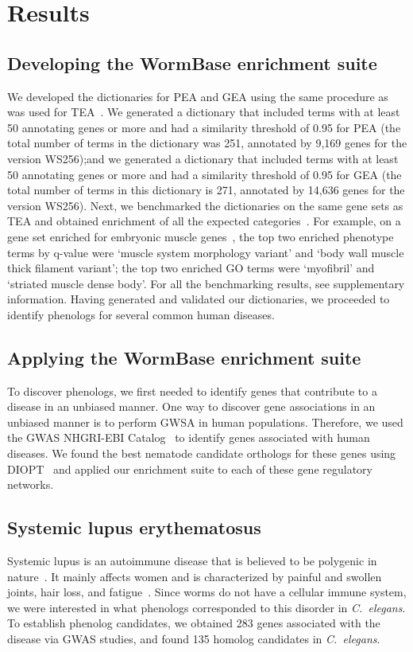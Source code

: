 \documentclass[10pt, onecolumn]{article}
\newcommand{\cel}{\emph{C.~elegans}}
\newcommand{\hlupus}{283}
\newcommand{\wlupus}{135}
\begin{document}
\section*{Results}
\subsection*{Developing the WormBase enrichment suite}
We developed the dictionaries for PEA and GEA using the same procedure as was
used for TEA~\cite{Angeles-Albores2016}. We generated a dictionary that included
terms with at least 50 annotating genes or more and had a similarity threshold
of 0.95 for PEA (the total number of terms in the dictionary was 251, annotated
by 9,169 genes for the version WS256);\@ and we generated a dictionary that
included terms with at least 50 annotating genes or more and had a similarity
threshold of 0.95 for GEA (the total number of terms in this dictionary is 271,
annotated by 14,636 genes for the version WS256). \@ Next, we benchmarked the
dictionaries on the same gene sets as TEA and obtained enrichment of all the
expected categories~\cite{Gaudet2004a, Spencer2011, Cinar2005, Watson2008a,
Pauli2006, Portman2004, Fox2007, Smith2010}. For example, on a gene set enriched
for embryonic muscle genes~\cite{Watson2008a}, the top two enriched phenotype
terms by q-value were `muscle system morphology variant' and `body wall muscle
thick filament variant'; the top two enriched GO terms were `myofibril' and
`striated muscle dense body'. For all the benchmarking results, see
supplementary information. Having generated and validated our dictionaries, we
proceeded to identify phenologs for several common human diseases.

\subsection*{Applying the WormBase enrichment suite}
To discover phenologs, we first needed to identify genes that contribute to a
disease in an unbiased manner. One way to discover gene associations in an
unbiased manner is to perform GWSA in human populations. Therefore, we used the
GWAS NHGRI-EBI Catalog~\cite{MacArthur2016} to identify genes associated with
human diseases. We found the best nematode candidate orthologs for these genes
using DIOPT~\cite{Hu2011} and applied our enrichment suite to each of these gene
regulatory networks.

\subsection*{Systemic lupus erythematosus}
Systemic lupus is an autoimmune disease that is believed to be polygenic in
nature~\cite{Mohan2015}. It mainly affects women and is characterized by painful
and swollen joints, hair loss, and fatigue~\cite{Lisnevskaia2014}. Since worms
do not have a cellular immune system, we were interested in what phenologs
corresponded to this disorder in \cel{}. To establish phenolog candidates, we
obtained \hlupus{} genes associated with the disease via GWAS studies, and found
\wlupus{} homolog candidates in \cel{}.
\end{document}
